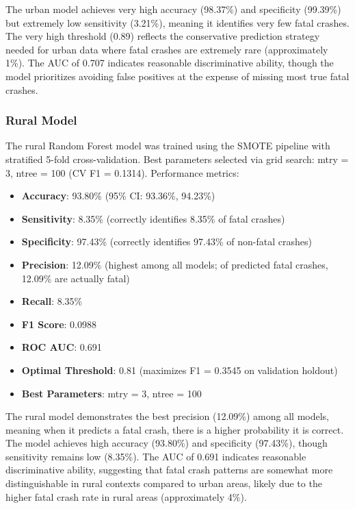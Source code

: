 \documentclass[12pt,a4paper]{article}
\begin{document}
The urban model achieves very high accuracy (98.37\%) and specificity (99.39\%) but extremely low sensitivity (3.21\%), meaning it identifies very few fatal crashes. The very high threshold (0.89) reflects the conservative prediction strategy needed for urban data where fatal crashes are extremely rare (approximately 1\%). The AUC of 0.707 indicates reasonable discriminative ability, though the model prioritizes avoiding false positives at the expense of missing most true fatal crashes.

\subsubsection{Rural Model}
The rural Random Forest model was trained using the SMOTE pipeline with stratified 5-fold cross-validation. Best parameters selected via grid search: mtry = 3, ntree = 100 (CV F1 = 0.1314). Performance metrics:
\begin{itemize}
    \item \textbf{Accuracy}: 93.80\% (95\% CI: 93.36\%, 94.23\%)
    \item \textbf{Sensitivity}: 8.35\% (correctly identifies 8.35\% of fatal crashes)
    \item \textbf{Specificity}: 97.43\% (correctly identifies 97.43\% of non-fatal crashes)
    \item \textbf{Precision}: 12.09\% (highest among all models; of predicted fatal crashes, 12.09\% are actually fatal)
    \item \textbf{Recall}: 8.35\%
    \item \textbf{F1 Score}: 0.0988
    \item \textbf{ROC AUC}: 0.691
    \item \textbf{Optimal Threshold}: 0.81 (maximizes F1 = 0.3545 on validation holdout)
    \item \textbf{Best Parameters}: mtry = 3, ntree = 100
\end{itemize}

The rural model demonstrates the best precision (12.09\%) among all models, meaning when it predicts a fatal crash, there is a higher probability it is correct. The model achieves high accuracy (93.80\%) and specificity (97.43\%), though sensitivity remains low (8.35\%). The AUC of 0.691 indicates reasonable discriminative ability, suggesting that fatal crash patterns are somewhat more distinguishable in rural contexts compared to urban areas, likely due to the higher fatal crash rate in rural areas (approximately 4\%).
\end{document}
